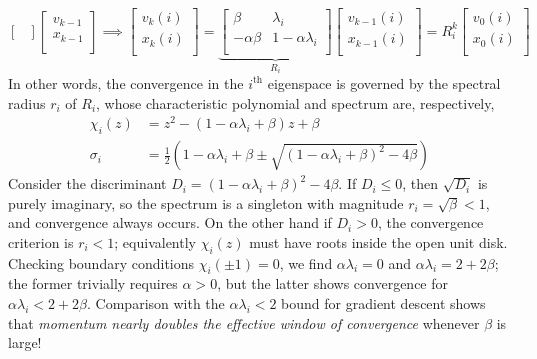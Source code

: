 \documentclass[11pt, letterpaper]{article}
\begin{document}
\begin{remark}
\[\begin{bmatrix}
        \end{bmatrix}
        \begin{bmatrix} 
            v_{k-1} \\
            x_{k-1} \\
        \end{bmatrix}
        \implies
        \begin{bmatrix} 
            v_k(i) \\ 
            x_k(i) \\ 
        \end{bmatrix}
        = \underbrace{
            \begin{bmatrix} 
                \beta & \lambda_i \\ 
                -\alpha\beta & 1 - \alpha \lambda_i \\ 
            \end{bmatrix}
        }_{R_i}
        \begin{bmatrix} 
            v_{k-1}(i) \\
            x_{k-1}(i) \\
        \end{bmatrix}
        = R_i^k \begin{bmatrix}
            v_0(i) \\
            x_0(i) \\
        \end{bmatrix}
    \]
    In other words, the convergence in the \(i^{\text{th}}\) eigenspace is governed by the spectral radius \(r_i\) of \(R_i\), whose characteristic polynomial and spectrum are, respectively, 
    \begin{align*}
        \chi_i(z) &= z^2 - (1 - \alpha \lambda_i + \beta) z + \beta \\
        \sigma_i &= \frac{1}{2} \left(1 - \alpha \lambda_i + \beta \pm \sqrt{(1 - \alpha \lambda_i + \beta)^2 - 4\beta}\right)
    \end{align*}
    Consider the discriminant \(D_i = (1 - \alpha \lambda_i + \beta)^2 - 4\beta\). If \(D_i \leq 0\), then \(\sqrt{D_i}\) is purely imaginary, so the spectrum is a singleton with magnitude \(r_i = \sqrt{\beta}<1\), and convergence always occurs. On the other hand if \(D_i > 0\), the convergence criterion is \(r_i < 1\); equivalently \(\chi_i(z)\) must have roots inside the open unit disk. Checking boundary conditions \(\chi_i(\pm 1) = 0\), we find \(\alpha \lambda_i = 0\) and \(\alpha \lambda_i = 2 + 2\beta\); the former trivially requires \(\alpha > 0\), but the latter shows convergence for \(\alpha \lambda_i < 2 + 2\beta\). Comparison with the \(\alpha \lambda_i < 2\) bound for gradient descent shows that \textit{momentum nearly doubles the effective window of convergence} whenever \(\beta\) is large!


\end{remark}
\end{document}
